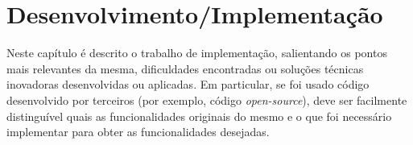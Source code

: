 \chapter{Desenvolvimento/Implementação}\label{cap:development}

Neste capítulo é descrito o trabalho de implementação, salientando os pontos mais relevantes da mesma, dificuldades  encontradas ou soluções técnicas inovadoras desenvolvidas ou aplicadas.  Em particular, se foi usado código desenvolvido por terceiros (por exemplo, código {\it open-source}), deve ser facilmente distinguível quais as funcionalidades originais do mesmo e o que foi necessário implementar para obter as funcionalidades desejadas.
